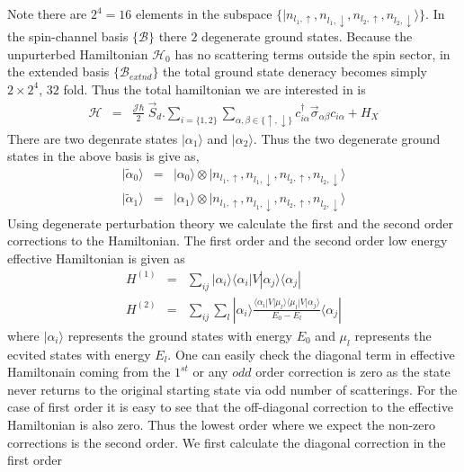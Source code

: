 \documentclass[reprint,prb,superscriptaddress]{revtex4-2}
\begin{document}
Note there are $2^4=16$ elements in the subspace $\{|n_{l_1,\uparrow},n_{l_1,\downarrow},n_{l_2,\uparrow},n_{l_2,\downarrow}\rangle\}$. In the spin-channel basis $\{\mathcal{B}\}$ there $2$ degenerate ground states. Because the unpurterbed Hamiltonian $\mathcal{H}_0$ has no scattering terms outside the spin sector, in the extended basis $\{\mathcal{B}_{extnd}\}$ the total ground state deneracy becomes simply $2\times 2^4$, $32$ fold. Thus the total hamiltonian we are interested in is 
\begin{eqnarray}
\mathcal{H} &=& \frac{{\mathcal{J}}\hbar}{2}~ \vec{S}_d. \displaystyle\sum_{i=\{1,2\}} \displaystyle\sum_{\alpha,\beta\in\{\uparrow,\downarrow\}}c_{i\alpha}^{\dagger} \vec{\sigma}_{\alpha\beta} c_{i\alpha} +H_X
\label{eq:excitation_hamiltonian}
\end{eqnarray}
There are two degenrate states $|\alpha_1\rangle$ and $|\alpha_2\rangle$. Thus the two degenerate ground states in the above basis is give as,
\begin{eqnarray}
|\tilde{\alpha}_0\rangle &=&| {\alpha}_0\rangle\otimes |n_{l_1,\uparrow},n_{l_1,\downarrow},n_{l_2,\uparrow},n_{l_2,\downarrow}\rangle \\
|\tilde{\alpha}_1\rangle &=& | {\alpha}_1\rangle\otimes |n_{l_1,\uparrow},n_{l_1,\downarrow},n_{l_2,\uparrow},n_{l_2,\downarrow}\rangle
\end{eqnarray}
Using degenerate perturbation theory we calculate the first and the second order corrections to the Hamiltonian. The first order and the second order low energy effective Hamiltonian is given as 
\begin{eqnarray}
H^{(1)} &=& \sum_{ij} |\alpha_i\rangle \langle \alpha_i  | V| \alpha_j \rangle \langle \alpha_j |~\nonumber\\
H^{(2)} &=& \sum_{ij} \sum_l |\alpha_i\rangle \frac{\langle \alpha_i  | V| \mu_l \rangle \langle \mu_l  | V| \alpha_j \rangle}{E_0-E_{l}}\langle \alpha_j |
\end{eqnarray}
where $|\alpha_i\rangle$ represents the ground states with energy $E_0$ and $\mu_l$ represents the ecvited states with energy $E_l$. One can easily check the diagonal term in effective Hamiltonain coming from the $1^{st}$ or any $odd$ order correction is zero as the state never returns to the original starting state via odd number of scatterings. For the case of first order it is easy to see that the off-diagonal correction to the effective Hamiltonian is also zero. Thus the lowest order where we expect the non-zero corrections is the second order. We first calculate the diagonal correction in the first order
\end{document}
